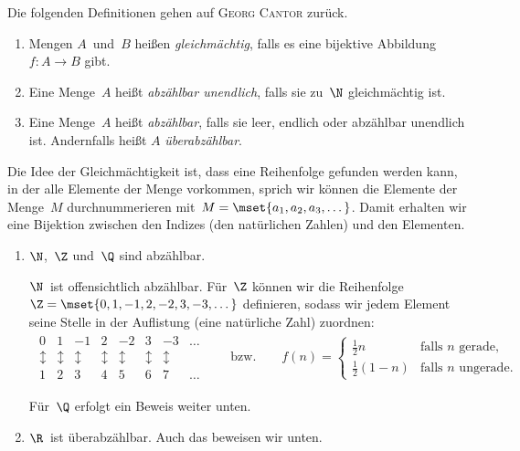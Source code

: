 \documentclass[a4paper]{article}
\begin{document}
Die folgenden Definitionen gehen auf \textsc{Georg Cantor} zurück.

\begin{definition}\leavevmode
    \begin{enumerate}
        \item Mengen $A$~und~$B$ heißen \emph{gleichmächtig}, falls es eine bijektive Abbildung $f\colon A \to B$ gibt.
        \item Eine Menge~$A$ heißt \emph{abzählbar unendlich}, falls sie zu~$\N$ gleichmächtig ist.
        \item Eine Menge~$A$ heißt \emph{abzählbar}, falls sie leer, endlich oder abzählbar unendlich ist. Andernfalls heißt $A$ \emph{überabzählbar}.
    \end{enumerate}
\end{definition}

Die Idee der Gleichmächtigkeit ist, dass eine Reihenfolge gefunden werden kann, in der alle Elemente der Menge vorkommen, sprich wir können die Elemente der Menge~$M$ durchnummerieren mit~$M = \mset{a_1, a_2, a_3, \dots}$. Damit erhalten wir eine Bijektion zwischen den Indizes (den natürlichen Zahlen) und den Elementen.


\begin{example}\leavevmode
    \begin{enumerate}
        \item $\N$,~$\Z$ und~$\Q$ sind abzählbar.

              $\N$~ist offensichtlich abzählbar. Für~$\Z$ können wir die Reihenfolge $\Z = \mset{0, 1, -1, 2, -2, 3, -3, \dots}$ definieren, sodass wir jedem Element seine Stelle in der Auflistung (eine natürliche Zahl) zuordnen:
              \begin{gather*}
                  \begin{matrix}
                      0            & 1            & -1           & 2            & -2           & 3            & -3           & \dots \\
                      \updownarrow & \updownarrow & \updownarrow & \updownarrow & \updownarrow & \updownarrow & \updownarrow &       \\
                      1            & 2            & 3            & 4            & 5            & 6            & 7            & \dots
                  \end{matrix}
                  \qquad\text{bzw.}\qquad
                  f(n) = \begin{cases}
                      \frac{1}{2}n     & \text{falls $n$~gerade},   \\
                      \frac{1}{2}(1-n) & \text{falls $n$~ungerade}.
                  \end{cases}
              \end{gather*}

              Für~$\Q$ erfolgt ein Beweis weiter unten.
        \item $\R$~ist überabzählbar. Auch das beweisen wir unten.
    \end{enumerate}
\end{example}
\end{document}
